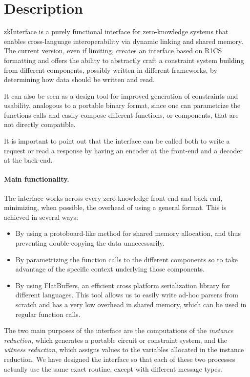 \section{Description}
		
		zkInterface is a purely functional interface for zero-knowledge systems that enables cross-language interoperability via dynamic linking and shared memory. The current version, even if limiting, creates an interface based on R1CS formatting and offers the ability to abstractly craft a constraint system building from different components, possibly written in different frameworks, by determining how data should be written and read. 
		
		It can also be seen as a design tool for improved generation of constraints and usability, analogous to a portable binary format, since one can parametrize the functions calls and easily compose different functions, or components, that are not directly compatible.
		
		It is important to point out that the interface can be called both to write a request or read a response by having an encoder at the front-end  and a decoder at the back-end. 
		
		\paragraph{Main functionality.}
		
		The interface works across every zero-knowledge front-end and back-end, minimizing, when possible, the overhead of using a general format. This is achieved in several ways:
        
        \begin{itemize}
			\item By using a protoboard-like method for shared memory allocation, and thus preventing double-copying the data unnecessarily.
			\item By parametrizing the function calls to the different components so to take advantage of the specific context underlying those components.
			\item By using FlatBuffers, an efficient cross platform serialization library for different languages. This tool allows us to easily write ad-hoc parsers from scratch and has a very low overhead in shared memory, which can be used in regular function calls. 
		\end{itemize}
		
        
        The two main purposes of the interface are the computations of the \emph{instance reduction}, which generates a portable circuit or constraint system, and the \emph{witness reduction}, which assigns values to the variables allocated in the instance reduction. We have designed the interface so that each of these two processes actually use the same exact routine, except with different message types.

